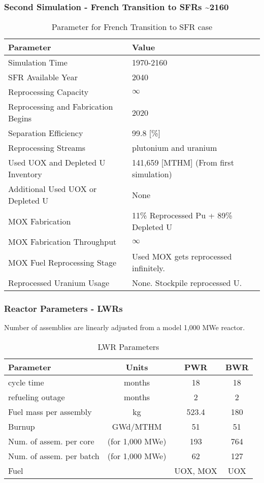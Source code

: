 \begin{frame}
	\frametitle{Second Simulation - French Transition to SFRs \textasciitilde 2160}
	
\begin{table}[h]
	\centering
	\begin{tabularx}{\textwidth}{bb}
		\hline
		Parameter & Value \\
		\hline
		Simulation Time & 1970-2160 \\
		\gls{SFR} Available Year & 2040 \\
		Reprocessing Capacity & $\infty$ \\
		Reprocessing and Fabrication Begins & 2020 \\
		Separation Efficiency & 99.8 [\%] \\
		Reprocessing Streams & plutonium and uranium \\
		\small{Used \gls{UOX} and Depleted U Inventory} & 141,659 [MTHM] {\small (From first simulation)} \\
		\small{Additional Used \gls{UOX} or Depleted U} & None  \\
		\gls{MOX} Fabrication &  \small{11\% Reprocessed Pu + 89\% Depleted U}  \\
		\gls{MOX} Fabrication Throughput & $\infty$ \\
		\gls{MOX} Fuel Reprocessing Stage &  Used \gls{MOX} gets reprocessed infinitely. \\
		Reprocessed Uranium Usage &  None. Stockpile reprocessed U. \\
		\hline
	\end{tabularx}
	\caption {Parameter for French Transition to \gls{SFR} case }
	\label{tab:sim_france}
\end{table}

\end{frame}


\begin{frame}
	\frametitle{Reactor Parameters - \glspl{LWR} }
	Number of assemblies are linearly adjusted from a model 1,000 MWe reactor.
	\begin{table}[h]
    \centering
    \begin{tabularx}{\textwidth}{bccc}
        \hline
        Parameter & Units & PWR & BWR \\
        \hline
        cycle time & months & 18 & 18   \\ 
        refueling outage & months & 2  & 2 \\
        Fuel mass per assembly & kg & 523.4 & 180 \\
        Burnup & GWd/MTHM & 51  & 51   \\
        \small{Num. of assem. per core} & (for 1,000 MWe) & 193  & 764 \\
        \small{Num. of assem. per batch} & (for 1,000 MWe) & 62 & 127 \\
        Fuel & & \gls{UOX}, \gls{MOX} & \gls{UOX}  \\
        \hline
    \end{tabularx}
    \caption {\gls{LWR} Parameters}
    \label{tab:lwr}
    \end{table}
\end{frame}


